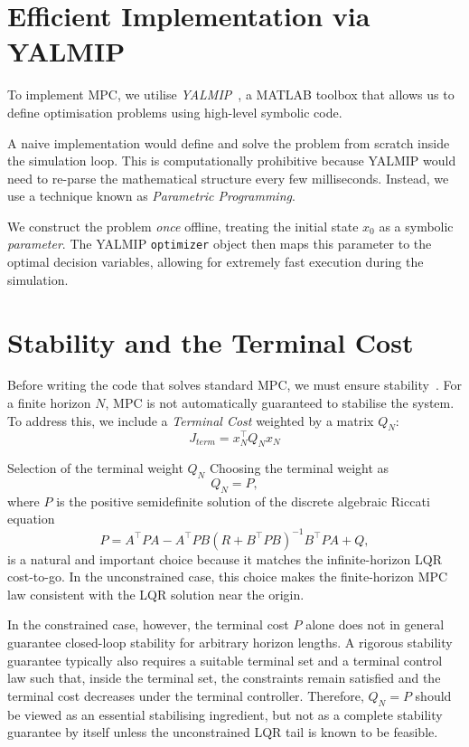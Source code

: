 \section{Efficient Implementation via YALMIP}

To implement MPC, we utilise \emph{YALMIP}~\cite{Lofberg2004}, a MATLAB toolbox that allows us to define optimisation problems using high-level symbolic code.

A naive implementation would define and solve the problem from scratch inside the simulation loop. This is computationally prohibitive because YALMIP would need to re-parse the mathematical structure every few milliseconds. Instead, we use a technique known as \emph{Parametric Programming}.

We construct the problem \emph{once} offline, treating the initial state $x_0$ as a symbolic \emph{parameter}. The YALMIP \texttt{optimizer} object then maps this parameter to the optimal decision variables, allowing for extremely fast execution during the simulation.

\section{Stability and the Terminal Cost}
Before writing the code that solves standard MPC, we must ensure stability~\cite{Mayne2000}. For a finite horizon $N$, MPC is not automatically guaranteed to stabilise the system. To address this, we include a \emph{Terminal Cost} weighted by a matrix $Q_N$:
\begin{equation*}
	J_{term} = x_N^\top Q_N x_N
\end{equation*}

\begin{alertbox}{Selection of the terminal weight $Q_N$}
Choosing the terminal weight as
\[
Q_N = P,
\]
where \(P\) is the positive semidefinite solution of the discrete algebraic Riccati equation
\[
P = A^\top P A - A^\top P B (R + B^\top P B)^{-1} B^\top P A + Q,
\]
is a natural and important choice because it matches the infinite-horizon LQR cost-to-go. In the unconstrained case, this choice makes the finite-horizon MPC law consistent with the LQR solution near the origin. 

In the constrained case, however, the terminal cost \(P\) alone does not in general guarantee closed-loop stability for arbitrary horizon lengths. A rigorous stability guarantee typically also requires a suitable terminal set and a terminal control law such that, inside the terminal set, the constraints remain satisfied and the terminal cost decreases under the terminal controller. Therefore, \(Q_N=P\) should be viewed as an essential stabilising ingredient, but not as a complete stability guarantee by itself unless the unconstrained LQR tail is known to be feasible.
\end{alertbox}


